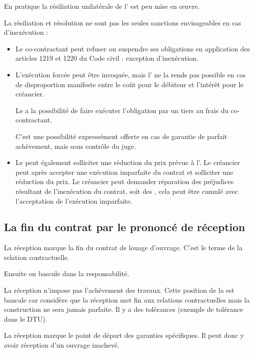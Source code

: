 					En pratique la résiliation unilatérale de l’ est peu mise en œuvre.


					\bigskip La résiliation et résolution ne sont pas les seules sanctions envisageables en cas d’inexécution :
					\begin{itemize}
						\item Le co-contractant peut refuser ou suspendre ses obligations en application des articles 1219 et 1220 du Code civil : exception d’inexécution.

						\item L’exécution forcée peut être invoquée, mais l' ne la rends pas possible en cas de disproportion manifeste entre le coût pour le débiteur et l’intérêt pour le créancier.

						Le \Mo a la possibilité de faire exécuter l’obligation par un tiers au frais du co-contractant.


						C’est une possibilité expressément offerte en cas de garantie de parfait achèvement, mais sous contrôle du juge.


						\item Le \Mo peut également solliciter une réduction du prix prévue à l'. Le créancier peut après \med accepter une exécution imparfaite du contrat et solliciter une réduction du prix.
Le créancier peut demander réparation des préjudices résultant de l’inexécution du contrat, soit des \di, cela peut être cumulé avec l’acceptation de l’exécution imparfaite.

					\end{itemize}


		\subsection{La fin du contrat par le prononcé de réception}

			La réception marque la fin du contrat de louage d’ouvrage. C’est le terme de la relation contractuelle.


			\medskip Ensuite on bascule dans la responsabilité.


			\medskip La réception n’impose pas l’achèvement des travaux. Cette position de la \CourDeCas est bancale car considère que la réception met fin aux relations contractuelles mais la construction ne sera jamais parfaite. Il y a des tolérances (exemple de tolérance dans le DTU).

			\medskip La réception marque le point de départ des garanties spécifiques. Il peut donc y avoir réception d’un ouvrage inachevé.


